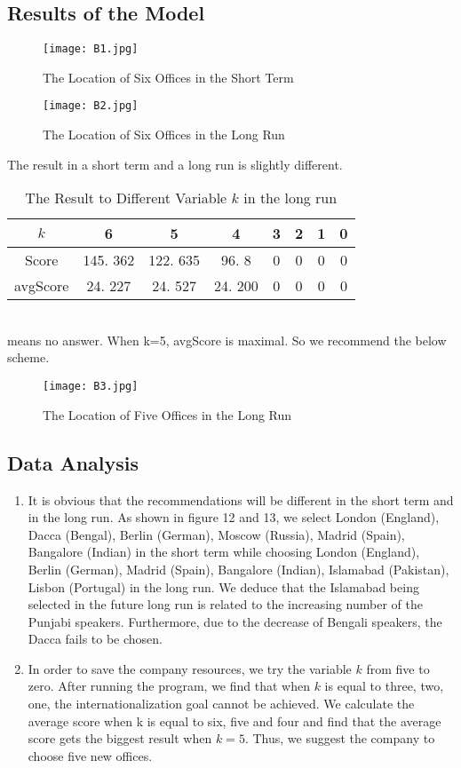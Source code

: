 \documentclass{mcmthesis}
\begin{document}
\subsection{Results of the Model}
\begin{figure}[htbp]
\centering
\texttt{[image: B1.jpg]}
\caption{The Location of Six Offices in the Short Term}
\end{figure}
\begin{figure}[htbp]
\centering
\texttt{[image: B2.jpg]}
\caption{The Location of Six Offices in the Long Run}
\end{figure}
The result in a short term and a long run is slightly different. 
\begin{table}[htbp]
\centering
\caption{The Result to Different Variable \(k\) in the long run}\label{The Result to Different Variable k}
\begin{tabular}{|c|c|c|c|c|c|c|c|}
\hline
\(k\)&6&5&4&3&2&1&0\\
\hline
Score&145. 362&122. 635&96. 8&0&0&0&0\\
\hline
avgScore&24. 227&24. 527&24. 200&0&0&0&0\\
\hline
\end{tabular} 
\end{table}\\
 means no answer. When k=5, avgScore is maximal. So we recommend the below scheme. 
 \begin{figure}[htbp]
\centering
\texttt{[image: B3.jpg]}
\caption{The Location of Five Offices in the Long Run}
\end{figure}

\subsection{Data Analysis}
\begin{enumerate}[A]
\item It is obvious that the recommendations will be different in the short term and in the long run. As shown in figure 12 and 13, we select London (England), Dacca (Bengal), Berlin (German), Moscow (Russia), Madrid (Spain), Bangalore (Indian) in the short term while choosing London (England), Berlin (German), Madrid (Spain), Bangalore (Indian), Islamabad (Pakistan), Lisbon (Portugal) in the long run. We deduce that the Islamabad being selected in the future long run is related to the increasing number of the Punjabi speakers. Furthermore, due to the decrease of Bengali speakers, the Dacca fails to be chosen. 
\item In order to save the company resources, we try the variable \(k\) from five to zero. After running the program, we find that when \(k\) is equal to three, two, one, the internationalization goal cannot be achieved. We calculate the average score when k is equal to six, five and four and find that the average score gets the biggest result when \(k=5\). Thus, we suggest the company to choose five new offices. 
\end{enumerate}
\end{document}
